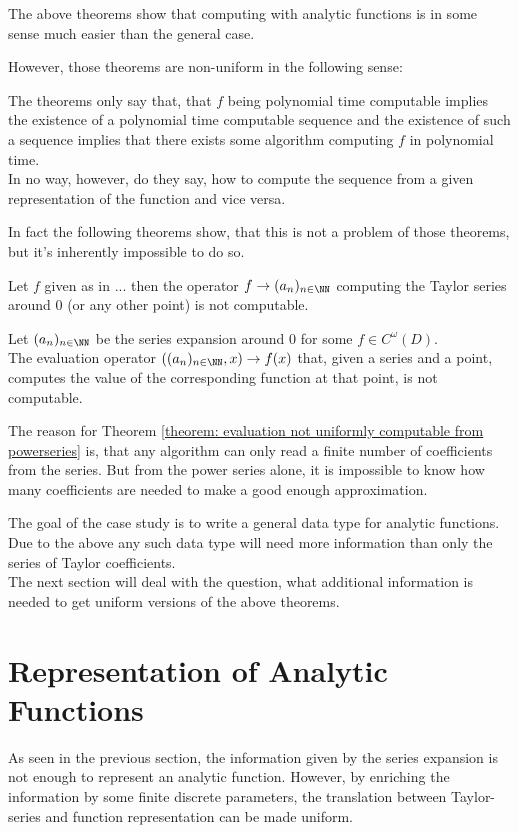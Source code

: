 		The above theorems show that computing with analytic functions is in some sense much easier than the general case.

		However, those theorems are non-uniform in the following sense:

		The theorems only say that, that $f$ being polynomial time computable implies the existence of a polynomial time computable sequence
		and the existence of such a sequence implies that there exists some algorithm computing $f$ in polynomial time. \\
		In no way, however, do they say, how to compute the sequence from a given representation of the function and vice versa.

		In fact the following theorems show, that this is not a problem of those theorems, but it's inherently impossible to do so.
		\begin{theorem}
			Let $f$ given as in ... then the operator $f \to (a_n)_{n \in \NN}$ computing the Taylor series around $0$ (or any other point) is not computable.
		\end{theorem} 
		\begin{theorem}\label{theorem: evaluation not uniformly computable from powerseries}
			Let $(a_n)_{n \in \NN}$ be the series expansion around $0$ for some $f \in C^\omega(D)$.\\
			The evaluation operator $((a_n)_{n \in \NN}, x) \to f(x)$ that, given a series and a point, computes the value of the corresponding function at that point, is not computable.
		\end{theorem} 

		The reason for Theorem \ref{theorem: evaluation not uniformly computable from powerseries} is, that any algorithm can only read a finite number of 
		coefficients from the series. But from the power series alone, it is impossible to know how many coefficients are needed to make
		a good enough approximation. 

		The goal of the case study is to write a general data type for analytic functions. 
		Due to the above any such data type will need more information than only the series of Taylor coefficients. \\
		The next section will deal with the question, what additional information is needed to get uniform versions of the above theorems.

	\section{Representation of Analytic Functions}
	 As seen in the previous section, the information given by the series expansion is not enough to represent an analytic function.
	 However, by enriching the information by some finite discrete parameters, the translation between Taylor-series and function representation can be made uniform.
	 
